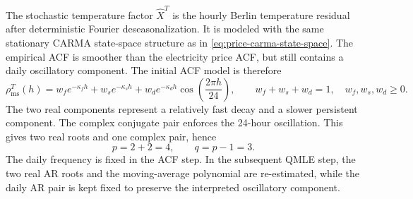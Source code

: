 The stochastic temperature factor \(\widehat X^T\) is the hourly Berlin
temperature residual after deterministic Fourier deseasonalization. It is
modeled with the same stationary CARMA state-space structure as in
\cref{eq:price-carma-state-space}. The empirical ACF is smoother than the
electricity price ACF, but still contains a daily oscillatory component. The
initial ACF model is therefore
\begin{equation}
  \rho_{\mathrm{ms}}^T(h)
  =
  w_f e^{-\kappa_f h}
  +
  w_s e^{-\kappa_s h}
  +
  w_d e^{-\kappa_d h}
  \cos\left(\frac{2\pi h}{24}\right),
  \qquad
  w_f+w_s+w_d=1,\quad w_f,w_s,w_d\ge 0 .
  \label{eq:temperature-multiscale-acf}
\end{equation}
The two real components represent a relatively fast decay and a slower
persistent component. The complex conjugate pair enforces the 24-hour
oscillation. This gives two real roots and one complex pair, hence
\[
  p = 2 + 2 = 4,
  \qquad q=p-1=3 .
\]
The daily frequency is fixed in the ACF step. In the subsequent QMLE step, the
two real AR roots and the moving-average polynomial are re-estimated, while the
daily AR pair is kept fixed to preserve the interpreted oscillatory component.

\FloatBarrier

